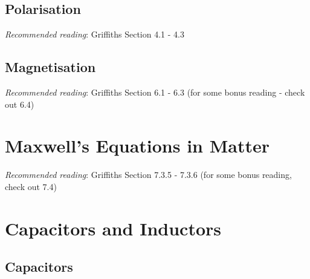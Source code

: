 \documentclass[
  letterpaper,
  DIV=11,
  numbers=noendperiod]{scrreprt}
\begin{document}
\newcommand{\l}{\mathrm{\mathbf{l}}}
\newcommand{\E}{\mathrm{\mathbf{E}}}
\newcommand{\F}{\mathrm{\mathbf{F}}}
\newcommand{\r}{\mathrm{\mathbf{r}}}

\newcommand{\x}{\mathrm{\mathbf{x}}}
\newcommand{\y}{\mathrm{\mathbf{y}}}
\newcommand{\z}{\mathrm{\mathbf{z}}}

\section{Polarisation}\label{polarisation}

\emph{Recommended reading}: Griffiths Section 4.1 - 4.3

\section{Magnetisation}\label{magnetisation}

\emph{Recommended reading}: Griffiths Section 6.1 - 6.3 (for some bonus
reading - check out 6.4)


\chapter{Maxwell's Equations in
Matter}\label{maxwells-equations-in-matter}

\newcommand{\l}{\mathrm{\mathbf{l}}}
\newcommand{\E}{\mathrm{\mathbf{E}}}
\newcommand{\F}{\mathrm{\mathbf{F}}}
\newcommand{\r}{\mathrm{\mathbf{r}}}

\newcommand{\x}{\mathrm{\mathbf{x}}}
\newcommand{\y}{\mathrm{\mathbf{y}}}
\newcommand{\z}{\mathrm{\mathbf{z}}}

\emph{Recommended reading}: Griffiths Section 7.3.5 - 7.3.6 (for some
bonus reading, check out 7.4)


\chapter{Capacitors and Inductors}\label{capacitors-and-inductors}

\newcommand{\l}{\mathrm{\mathbf{l}}}
\newcommand{\E}{\mathrm{\mathbf{E}}}
\newcommand{\F}{\mathrm{\mathbf{F}}}
\newcommand{\r}{\mathrm{\mathbf{r}}}

\newcommand{\x}{\mathrm{\mathbf{x}}}
\newcommand{\y}{\mathrm{\mathbf{y}}}
\newcommand{\z}{\mathrm{\mathbf{z}}}

\section{Capacitors}\label{capacitors}
\end{document}
